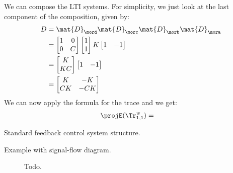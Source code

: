 \begin{example}
We can compose the LTI systems.
For simplicity, we just look at the last component of the composition, given by:
\begin{equation*}
\begin{aligned}
D&=\mat{D}_\mord \mat{D}_\morc \mat{D}_\morb \mat{D}_\mora\\
&=\begin{bmatrix}1 & 0\\ 0 & {C}\end{bmatrix} \begin{bmatrix} 1\\ 1 \end{bmatrix}  K \begin{bmatrix} 1 & -1 \end{bmatrix}\\
&=\begin{bmatrix}K \\ {KC}\end{bmatrix}\begin{bmatrix} 1 & -1 \end{bmatrix}\\
&=\begin{bmatrix}
K&-K\\
CK&-CK
\end{bmatrix}
\end{aligned}
\end{equation*}
We can now apply the formula for the trace and we get:
\begin{equation*}
\begin{aligned}
\projE(\Tr_{1,1}^{w})&=
\end{aligned}
\end{equation*}



\begin{marginfigure}
\begin{center}
\caption{Standard feedback control system structure. \label{fig:std_ctr}}
\end{center}
\caption{Example with signal-flow diagram.}
\label{fig:lti-ex-signalflow}
\end{marginfigure}
\end{example}


\begin{figure}
\caption{Todo.}
\label{fig:lti-ex-signalflow-bis}
\end{figure}